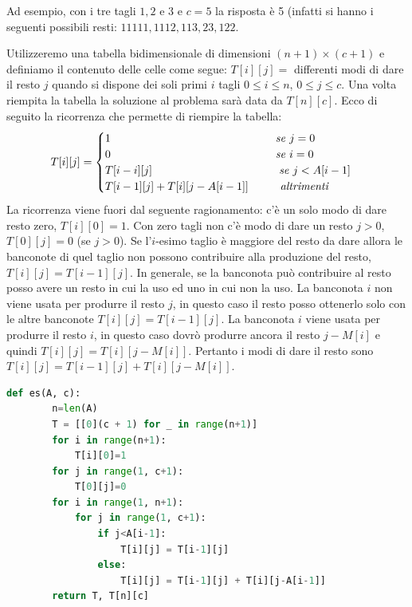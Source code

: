 Ad esempio, con i tre tagli $1,2$ e $3$ e $c=5$ la risposta è 5 (infatti si hanno i seguenti possibili resti: $11111, 1112, 113, 23, 122$.

Utilizzeremo una tabella bidimensionale di dimensioni $(n+1)\times (c+1)$ e definiamo il contenuto delle celle come segue: $T[i][j]=$ differenti modi di dare il resto $j$ quando si dispone dei soli primi $i$ tagli $0\leq i\leq n$, $0\leq j\leq c$. Una volta riempita la tabella la soluzione al problema sarà data da $T[n][c]$. Ecco di seguito la ricorrenza che permette di riempire la tabella:
\begin{equation*}T[i][j]=
\begin{cases}
    1\hspace{5.2cm}\textit{se }j=0\\
    0\hspace{5.2cm}\textit{se }i=0\\
    T[i-i][j]\hspace{4cm}\textit{se }j<A[i-1]\\
    T[i-1][j]+T[i][j-A[i-1]]\hspace{1cm}\textit{altrimenti}
\end{cases}
\end{equation*}
La ricorrenza viene fuori dal seguente ragionamento: c'è un solo modo di dare resto zero, $T[i][0] = 1$. Con zero tagli non c'è modo di dare un resto $j>0$, $T[0][j] =0$ (se $j > 0$). Se l'$i$-esimo taglio è maggiore del resto da dare allora le banconote di quel taglio non possono contribuire alla produzione del resto, $T[i][j] = T[i - 1][j]$. In generale, se la banconota può contribuire al resto posso avere un resto in cui la uso ed uno in cui non la uso. La banconota $i$ non viene usata per produrre il resto $j$, in questo caso il resto posso ottenerlo solo con le altre banconote $T[i][j] = T[i-1][j]$. La banconota $i$ viene usata per produrre il resto $i$, in questo caso dovrò produrre ancora il resto $j-M[i]$ e quindi $T[i][j] = T[i][j-M[i]]$. Pertanto i modi di dare il resto sono $T[i][j] = T[i - 1][j] + T[i][j - M[i]]$.
\begin{lstlisting}[language=Python]
    def es(A, c):
        n=len(A)
        T = [[0](c + 1) for _ in range(n+1)]
        for i in range(n+1):
            T[i][0]=1
        for j in range(1, c+1):
            T[0][j]=0
        for i in range(1, n+1):
            for j in range(1, c+1):
                if j<A[i-1]:
                    T[i][j] = T[i-1][j]
                else:
                    T[i][j] = T[i-1][j] + T[i][j-A[i-1]]
        return T, T[n][c]
\end{lstlisting}

